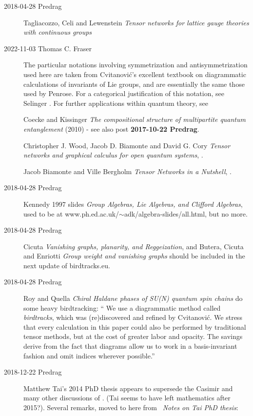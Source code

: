 \begin{description}
   \item[2018-04-28 Predrag]
Tagliacozzo, Celi and Lewenstein
{\em Tensor networks for lattice gauge theories with continuous groups}

\item[2022-11-03 Thomas C. Fraser]
The particular notations involving symmetrization and antisymmetrization used
here are taken from Cvitanovi{\'c}'s excellent textbook on diagrammatic
calculations of invariants of Lie groups, and are essentially the same those
used by Penrose. For a categorical justification of this
notation, see Selinger .
For further applications within quantum theory, see

Coecke and Kissinger
{\em The compositional structure of multipartite quantum entanglement}
(2010) - see also post {\bf 2017-10-22 Predrag}.

Christopher J. Wood, Jacob D. Biamonte and David G. Cory
{\em Tensor networks and graphical calculus for open quantum systems},
.

Jacob Biamonte and Ville Bergholm
{\em Tensor Networks in a Nutshell},
.


\item[2018-04-28 Predrag]
Kennedy 1997 slides
{\em Group Algebras, {Lie} Algebras, and {Clifford} Algebras},
used to be at www.ph.ed.ac.uk/$\sim$adk/algebra-slides/all.html, but no more.

\item[2018-04-28 Predrag]
Cicuta {\em Vanishing graphs, planarity, and {Reggeization}},
and
Butera, Cicuta and Enriotti {\em Group weight and vanishing graphs}
should be included in the next update of birdtracks.eu.

\item[2018-04-28 Predrag]
Roy and Quella
{\em Chiral Haldane phases of {SU}(N) quantum spin chains}
do some heavy birdtracking: ``
We  use  a  diagrammatic  method  called \emph{birdtracks},  which
was (re)discovered and refined by Cvitanovi{\'c}. We stress
that every calculation in this paper could also be performed
by traditional tensor methods, but at the cost of greater labor
and opacity. The savings derive from the fact that diagrams
allow us to work in a basis-invariant fashion and omit indices
wherever possible.''

\item[2018-12-22 Predrag]
{Matthew Tai}'s 2014 PhD thesis
appears to supersede the Casimir and many other discussions of {\wwwgt}.
(Tai seems to have left mathematics after 2015?).
Several remarks,  moved to here from
~{\em Notes on Tai PhD thesis}:


\end{description}
